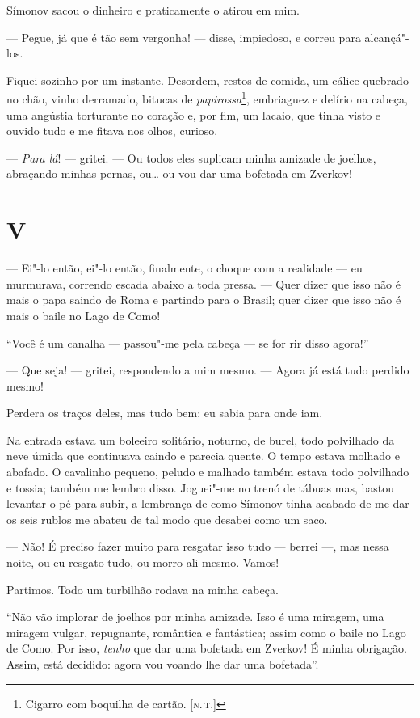 Símonov sacou o dinheiro e praticamente o atirou em mim.

--- Pegue, já que é tão sem vergonha! --- disse, impiedoso, e correu para
alcançá"-los.

Fiquei sozinho por um instante. Desordem, restos de comida, um cálice
quebrado no chão, vinho derramado, bitucas de \emph{papirossa}\footnote{Cigarro
  com boquilha de cartão. {[}\textsc{n.\,t.}{]}}, embriaguez e delírio na cabeça,
uma angústia torturante no coração e, por fim, um lacaio, que tinha
visto e ouvido tudo e me fitava nos olhos, curioso.

--- \emph{Para lá}! --- gritei. --- Ou todos eles suplicam minha amizade de
joelhos, abraçando minhas pernas, ou\ldots{} ou vou dar uma bofetada em
Zverkov!

\section{V}

--- Ei"-lo então, ei"-lo então, finalmente, o choque com a realidade --- eu
murmurava, correndo escada abaixo a toda pressa. --- Quer dizer que isso
não é mais o papa saindo de Roma e partindo para o Brasil; quer dizer
que isso não é mais o baile no Lago de Como!

``Você é um canalha --- passou"-me pela cabeça --- se for rir disso
agora!''

--- Que seja! --- gritei, respondendo a mim mesmo. --- Agora já está tudo
perdido mesmo!

Perdera os traços deles, mas tudo bem: eu sabia para onde iam.

Na entrada estava um boleeiro solitário, noturno, de burel, todo
polvilhado da neve úmida que continuava caindo e parecia quente. O tempo
estava molhado e abafado. O cavalinho pequeno, peludo e malhado também
estava todo polvilhado e tossia; também me lembro disso. Joguei"-me no
trenó de tábuas mas, bastou levantar o pé para subir, a lembrança de
como Símonov tinha acabado de me dar os seis rublos me abateu de tal
modo que desabei como um saco.

--- Não! É preciso fazer muito para resgatar isso tudo --- berrei ---, mas
nessa noite, ou eu resgato tudo, ou morro ali mesmo. Vamos!

Partimos. Todo um turbilhão rodava na minha cabeça.

``Não vão implorar de joelhos por minha amizade. Isso é uma miragem, uma
miragem vulgar, repugnante, romântica e fantástica; assim como o baile
no Lago de Como. Por isso, \emph{tenho} que dar uma bofetada em Zverkov!
É minha obrigação. Assim, está decidido: agora vou voando lhe dar uma
bofetada''.

